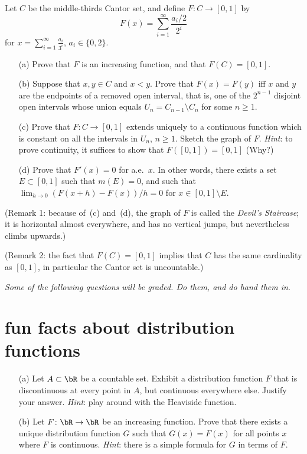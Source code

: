 \documentclass[lang=cn,11pt]{elegantbook}
\begin{document}
  Let $C$ be the middle-thirds Cantor set, and define $F\colon C\to [0,1]$ by
  \begin{equation}\label{eq:Cantorfunctiondefn}
    F(x)= \sum_{i=1}^\infty \frac{a_i/2}{2^i}
  \end{equation}
  for $x=\sum_{i=1}^\infty \frac{a_i}{3^i}$, $a_i\in \{0, 2\}$. 
  \begin{itemize}
  \item[(a)]
    Prove that $F$ is an increasing function, and that $F(C)=[0,1]$.
  \item[(b)]
    Suppose that $x,y\in C$ and $x<y$. Prove that $F(x)=F(y)$ iff $x$ and $y$ are the endpoints of a removed open interval, that is, one of the $2^{n-1}$ disjoint open intervals whose union equals $U_n=C_{n-1}\setminus C_n$ for some $n\ge1$.
  \item[(c)]
    Prove that $F\colon C\to[0,1]$ extends uniquely to a continuous function which is constant on all the intervals in $U_n$, $n\ge 1$. Sketch the graph of $F$.
    \textit{Hint}: to prove continuity, it suffices to show that $F([0,1])=[0,1]$ (Why?)
  \item[(d)]
    Prove that $F'(x)=0$ for a.e.\ $x$. In other words, there exists a set $E\subset[0,1]$ such that $m(E)=0$, and such that $\lim_{h\to 0}(F(x+h)-F(x))/h=0$ for $x\in[0,1]\setminus E$.
  \end{itemize}
  (Remark 1: because of~(c) and~(d), the graph of $F$ is called the \emph{Devil's Staircase}; it is horizontal almost everywhere, and has no vertical jumps, but nevertheless climbs upwards.)

  (Remark 2: the fact that $F(C)=[0,1]$ implies that $C$ has the same cardinality as $[0,1]$, in particular the Cantor set is uncountable.) 


\begin{center}
\textit{Some of the following questions will be graded. Do them, and do hand them in}.
\end{center}


\section{fun facts about distribution functions}
  \begin{itemize}
  \item[(a)]  Let $A\subset\bR$ be a countable set. Exhibit a distribution function $F$ that is discontinuous at every point in $A$, but continuous everywhere else. Justify your answer. \textit{Hint}: play around with the Heaviside function.
  \item[(b)]Let $F\colon\bR\to\bR$ be an increasing function. Prove that there exists a unique distribution function $G$ such that $G(x)=F(x)$ for all points $x$ where $F$ is continuous.
    \textit{Hint}: there is a simple formula for $G$ in terms of $F$.
  \end{itemize}
\end{document}
